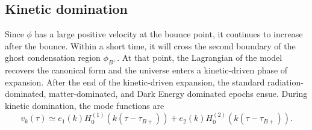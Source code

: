 \documentclass[12pt,a4paper]{article}
\numberwithin{equation}{section}
\numberwithin{equation}{section}
\begin{document}
\subsection{Kinetic domination}
Since $\phi$ has a large positive velocity at the bounce point, it continues to increase after the bounce. Within a short time, it will cross the second boundary of the ghost
condensation region $\phi_{B^+}$. At that point, the Lagrangian
of the model recovers the canonical form and the universe
enters a kinetic-driven phase of expansion. After the end of the kinetic-driven expansion, the standard radiation-dominated, matter-dominated, and Dark Energy dominated epochs ensue. %
During kinetic domination, the mode functions are
\begin{equation}
     v_k(\tau)\simeq e_1(k) H^{(1)}_0(k (\tau-\tau_{B+})) +  e_2(k) H^{(2)}_0(k (\tau-\tau_{B+})).
\end{equation}
\end{document}
